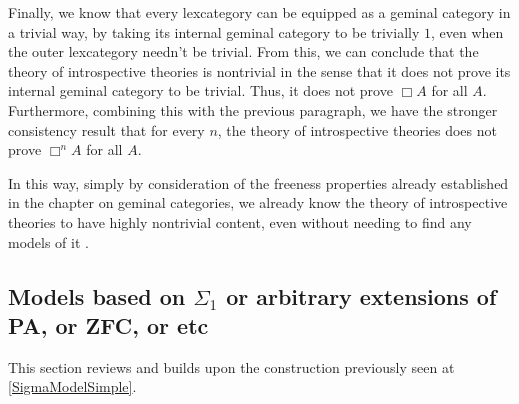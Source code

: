 Finally, we know that every lexcategory can be equipped as a geminal category in a trivial way, by taking its internal geminal category to be trivially $1$, even when the outer lexcategory needn't be trivial. From this, we can conclude that the theory of introspective theories is nontrivial in the sense that it does not prove its internal geminal category to be trivial. Thus, it does not prove $\Box A$ for all $A$. Furthermore, combining this with the previous paragraph, we have the stronger consistency result that for every $n$, the theory of introspective theories does not prove $\Box^n A$ for all $A$.

In this way, simply by consideration of the freeness properties already established in the chapter on geminal categories, we already know the theory of introspective theories to have highly nontrivial content, even without needing to find any models of it .


\subsection{Models based on \texorpdfstring{$\Sigma_1$}{Sigma-1} or arbitrary extensions of PA, or ZFC, or etc}

This section reviews and builds upon the construction previously seen at \cref{SigmaModelSimple}.

